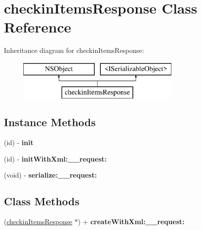 \hypertarget{interfacecheckin_items_response}{}\section{checkin\+Items\+Response Class Reference}
\label{interfacecheckin_items_response}
Inheritance diagram for checkin\+Items\+Response\+:\begin{figure}[H]
\begin{center}
\leavevmode
\includegraphics[height=2.000000cm]{interfacecheckin_items_response}
\end{center}
\end{figure}
\subsection*{Instance Methods}
\begin{DoxyCompactItemize}
\item 
\hypertarget{interfacecheckin_items_response_a279a84aaf30be2508f9dbec73c1b8239}{}(id) -\/ {\bfseries init}\label{interfacecheckin_items_response_a279a84aaf30be2508f9dbec73c1b8239}

\item 
\hypertarget{interfacecheckin_items_response_abba623d2bc11b8179dc935d26e42584b}{}(id) -\/ {\bfseries init\+With\+Xml\+:\+\_\+\+\_\+request\+:}\label{interfacecheckin_items_response_abba623d2bc11b8179dc935d26e42584b}

\item 
\hypertarget{interfacecheckin_items_response_a8c7235a049f62562d74c3c8c192fd843}{}(void) -\/ {\bfseries serialize\+:\+\_\+\+\_\+request\+:}\label{interfacecheckin_items_response_a8c7235a049f62562d74c3c8c192fd843}

\end{DoxyCompactItemize}
\subsection*{Class Methods}
\begin{DoxyCompactItemize}
\item 
\hypertarget{interfacecheckin_items_response_a04a780daef79cde8a74d8ba88f642fb9}{}(\hyperlink{interfacecheckin_items_response}{checkin\+Items\+Response} $\ast$) + {\bfseries create\+With\+Xml\+:\+\_\+\+\_\+request\+:}\label{interfacecheckin_items_response_a04a780daef79cde8a74d8ba88f642fb9}

\end{DoxyCompactItemize}
